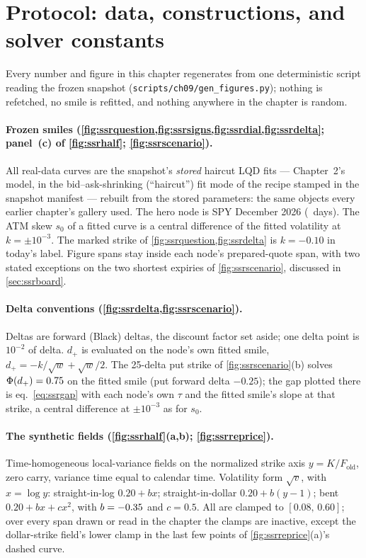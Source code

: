 \section{Protocol: data, constructions, and solver constants}
\label{app:ssrprotocol}

Every number and figure in this chapter regenerates from one
deterministic script reading the frozen snapshot
(\texttt{scripts/ch09/gen\_figures.py}); nothing is refetched, no
smile is refitted, and nothing anywhere in the chapter is random.

\paragraph{Frozen smiles
(\cref{fig:ssrquestion,fig:ssrsigns,fig:ssrdial,fig:ssrdelta};
panel~(c) of \cref{fig:ssrhalf}; \cref{fig:ssrscenario}).}
All real-data curves are the snapshot's \emph{stored} haircut LQD
fits --- Chapter~2's model, in the bid--ask-shrinking (``haircut'')
fit mode of the recipe stamped in the snapshot manifest --- rebuilt
from the stored parameters: the same objects every earlier chapter's
gallery used.  The hero node is SPY December 2026
(\MacSsrHeroDays\ days).  The ATM skew $s_0$ of a fitted curve is a
central difference of the fitted volatility at
$k=\pm10^{-3}$.  The marked strike of
\cref{fig:ssrquestion,fig:ssrdelta} is $k=-0.10$ in today's label.
Figure spans stay inside each node's prepared-quote span, with two
stated exceptions on the two shortest expiries of
\cref{fig:ssrscenario}, discussed in \cref{sec:ssrboard}.

\paragraph{Delta conventions (\cref{fig:ssrdelta,fig:ssrscenario}).}
Deltas are forward (Black) deltas, the discount factor set aside; one
delta point is $10^{-2}$ of delta.  $d_+$ is evaluated on the node's
own fitted smile, $d_+=-k/\sqrt{w}+\sqrt{w}/2$.  The 25-delta put
strike of \cref{fig:ssrscenario}(b) solves $\Phi(d_+)=0.75$ on the
fitted smile (put forward delta $-0.25$); the gap plotted there is
eq.~\eqref{eq:ssrgap} with each node's own $\tau$ and the fitted
smile's slope at that strike, a central difference at $\pm10^{-3}$
as for $s_0$.

\paragraph{The synthetic fields
(\cref{fig:ssrhalf}(a,b); \cref{fig:ssrreprice}).}
Time-homogeneous local-variance fields on the normalized strike axis
$y=K/F_{\mathrm{old}}$, zero carry, variance time equal to calendar
time.  Volatility form $\sqrt{v}$, with $x=\log y$:
straight-in-log $0.20+bx$; straight-in-dollar $0.20+b(y-1)$; bent
$0.20+bx+cx^{2}$, with $b=-0.35$ and $c=0.5$.  All are
clamped to $[0.08,\,0.60]$; over every span drawn or read in the
chapter the clamps are inactive, except the dollar-strike field's
lower clamp in the last few points of
\cref{fig:ssrreprice}(a)'s dashed curve.

